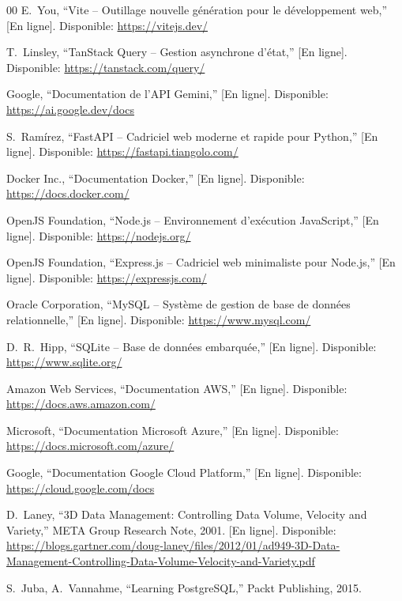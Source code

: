 \documentclass[10pt,twocolumn,a4paper]{article}
\begin{document}
\begin{thebibliography}{00}
 E.~You, ``Vite -- Outillage nouvelle génération pour le développement web,'' [En ligne]. Disponible: \url{https://vitejs.dev/}

 T.~Linsley, ``TanStack Query -- Gestion asynchrone d'état,'' [En ligne]. Disponible: \url{https://tanstack.com/query/}

 Google, ``Documentation de l'API Gemini,'' [En ligne]. Disponible: \url{https://ai.google.dev/docs}

 S.~Ramírez, ``FastAPI -- Cadriciel web moderne et rapide pour Python,'' [En ligne]. Disponible: \url{https://fastapi.tiangolo.com/}

 Docker Inc., ``Documentation Docker,'' [En ligne]. Disponible: \url{https://docs.docker.com/}

 OpenJS Foundation, ``Node.js -- Environnement d'exécution JavaScript,'' [En ligne]. Disponible: \url{https://nodejs.org/}

 OpenJS Foundation, ``Express.js -- Cadriciel web minimaliste pour Node.js,'' [En ligne]. Disponible: \url{https://expressjs.com/}

 Oracle Corporation, ``MySQL -- Système de gestion de base de données relationnelle,'' [En ligne]. Disponible: \url{https://www.mysql.com/}

 D.~R.~Hipp, ``SQLite -- Base de données embarquée,'' [En ligne]. Disponible: \url{https://www.sqlite.org/}

 Amazon Web Services, ``Documentation AWS,'' [En ligne]. Disponible: \url{https://docs.aws.amazon.com/}

 Microsoft, ``Documentation Microsoft Azure,'' [En ligne]. Disponible: \url{https://docs.microsoft.com/azure/}

 Google, ``Documentation Google Cloud Platform,'' [En ligne]. Disponible: \url{https://cloud.google.com/docs}

 D.~Laney, ``3D Data Management: Controlling Data Volume, Velocity and Variety,'' META Group Research Note, 2001. [En ligne]. Disponible: \url{https://blogs.gartner.com/doug-laney/files/2012/01/ad949-3D-Data-Management-Controlling-Data-Volume-Velocity-and-Variety.pdf}

 S.~Juba, A.~Vannahme, ``Learning PostgreSQL,'' Packt Publishing, 2015.

\end{thebibliography}
\end{document}
